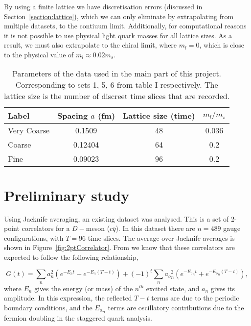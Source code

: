 \documentclass[a4paper,12pt]{article}
\begin{document}
By using a finite lattice we have discretisation errors (discussed in Section~\ref{section:lattice}), which we can only eliminate by extrapolating from multiple datasets, to the contiuum limit. Additionally, for computational reasons it is not possible to use physical light quark masses for all lattice sizes. As a result, we must also extrapolate to the chiral limit, where $m_l=0$, which is close to the physical value of $m_l \approx 0.02m_s$.

\begin{table}
\centering
\begin{tabular}{l S[table-format=1.5] S[table-format=2.0] S[table-format=1.3]}
    Label       & {Spacing $a$ (\si{fm})}   & {Lattice size (time)} & {$m_l / m_s$}\\
    \midrule 
    Very Coarse & 0.1509                    & 48                    & 0.036\\
    Coarse      & 0.12404                   & 64                    & 0.2\\
    Fine        & 0.09023                   & 96                    & 0.2\\
\end{tabular}
\caption{Parameters of the data used in the main part of this project. Corresponding to sets 1, 5, 6 from table I\cite{chakraborty2021improved} respectively. The lattice size is the number of discreet time slices that are recorded.\label{table:latticeSpacing}}
\end{table}


\section{Preliminary study}

Using Jacknife averaging, an existing dataset\cite{data:prelim_meff} was analysed. This is a set of 2-point correlators for a $D-$meson ($c\overline{q}$). In this dataset there are $n=489$ gauge configurations, with $T=96$ time slices. The average over Jacknife averages is shown in Figure~\ref{fig:2ptCorrelator}. From\cite{2016Chakraborty} we know that these correlators are expected to follow the following relationship,

\begin{equation}
    \label{eq:2ptCorrelator}
    G(t) = \sum_n a_n^2 (e^{-E_n t} + e^{-E_n(T-t)}) + {(-1)}^t \sum_n {a_o}_n^2 (e^{-{E_o}_n t} + e^{{-E_o}_n (T-t)}),
\end{equation}
where $E_n$ gives the energy (or mass) of the $n^{th}$ excited state, and $a_n$ gives its amplitude. In this expression, the reflected $T-t$ terms are due to the periodic boundary conditions, and the ${E_o}_n$ terms are oscillatory contributions due to the fermion doubling in the staggered quark analysis. 
\end{document}
